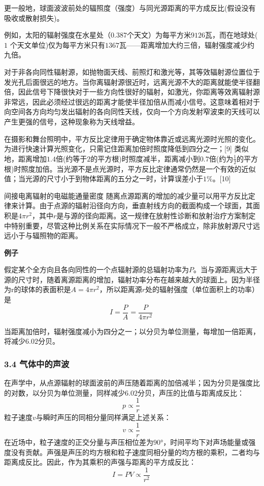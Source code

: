 更一般地，球面波波前处的辐照度（强度）与同光源距离的平方成反比(假设没有吸收或散射损失)。

例如，太阳的辐射强度在水星处（$0.387$个天文）为每平方米$9126$瓦，而在地球处($1$ 个天文单位)仅为每平方米只有$1367$瓦——距离增加大约三倍，辐射强度减少约九倍。

对于非各向同性辐射源，如抛物面天线、前照灯和激光等，其等效辐射源位置位于发光孔后面很远的地方。当你离辐射源很近时，远离光源不大的距离就能使半径翻倍，因此信号下降很快对于一些方向性很好的辐射，如激光，你距离等效离辐射源非常远，因此必须经过很远的距离才能使半径加倍从而减小信号。这意味着相对于向空间各方向均匀发出辐射的各向同性天线，仅向一个方向发射窄波束的天线可以产生更强的信号，这种现象称为天线增益。

在摄影和舞台照明中，平方反比定律用于确定物体靠近或远离光源时光照的变化。为进行快速计算光照变化，只需记住距离加倍时照度降低到四分之一；[9] 类似地，距离增加$1.4$倍(约等于$2$的平方根)时照度减半，距离减小到$0.7$倍(约为$\frac{1}{2}$的平方根)时照度加倍。当光源不是点光源时，平方反比定律通常仍然是一个有效的近似值；当光源的尺寸小于到物体距离的五分之一时，计算误差小于$1 \%$。[10]

间接电离辐射的电磁能通量密度 随离点源距离的增加的减少量可以用平方反比定律来计算。由于点源的辐射沿径向方向，垂直射线方向的截面构成一个球面，其面积是$4\pi r^2$，其中$r$是与源的径向距离。这一规律在放射性诊断和放射治疗方案制定中特别重要，尽管这种比例关系在实际情况下一般不严格成立，除非放射源尺寸远远小于与辐照物的距离。

\textbf{例子}

假定某个全方向且各向同性的一个点辐射源的总辐射功率为$P$。当与源距离远大于源的尺寸时，随着离源距离的增加，辐射功率分布在越来越大的球面上。因为半径为r的球体的表面积是$A=4\pi r^2$，所以距离源$r$处的辐射强度（单位面积上的功率）是
\begin{equation}
I=\frac{P}{A}=\frac{P}{4\pi r^2}~
\end{equation}

当距离加倍时，辐射强度减小为四分之一；以分贝为单位测量，每增加一倍距离，将减少$6.02$分贝。

\subsubsection{3.4 气体中的声波}
在声学中，从点源辐射的球面波前的声压随着距离的加倍减半；因为分贝是强度比的对数，以分贝为单位测量，同样减少$6.02$分贝，声压的比值与距离成反比：
\begin{equation}
p  \propto \frac{1}{r}~
\end{equation}
粒子速度$v$与瞬时声压的同相分量同样满足上述关系：
\begin{equation}
v  \propto \frac{1}{r}~
\end{equation}
在近场中，粒子速度的正交分量与声压相位差为$90$°，时间平均下对声场能量或强度没有贡献。声强是声压的均方根和粒子速度同相分量的均方根的乘积，二者均与距离成反比。因此，作为其乘积的声强与距离的平方成反比：
\begin{equation}
I=PV \propto \frac{1}{r^2}~
\end{equation}
